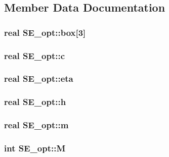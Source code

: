 \subsection{\-Member \-Data \-Documentation}
\hypertarget{structSE__opt_ab90d21148b629a403739afb5c6ccd980}{
\subsubsection[{box}]{\setlength{\rightskip}{0pt plus 5cm}real {\bf \-S\-E\-\_\-opt\-::box}\mbox{[}3\mbox{]}}}\label{structSE__opt_ab90d21148b629a403739afb5c6ccd980}
\hypertarget{structSE__opt_aa8df042d2bbed10a996da67e098d2f00}{
\subsubsection[{c}]{\setlength{\rightskip}{0pt plus 5cm}real {\bf \-S\-E\-\_\-opt\-::c}}}\label{structSE__opt_aa8df042d2bbed10a996da67e098d2f00}
\hypertarget{structSE__opt_a028a96f30b3050e2dfa438a63e6a2a39}{
\subsubsection[{eta}]{\setlength{\rightskip}{0pt plus 5cm}real {\bf \-S\-E\-\_\-opt\-::eta}}}\label{structSE__opt_a028a96f30b3050e2dfa438a63e6a2a39}
\hypertarget{structSE__opt_ae2e1880825b1f20403030c2b8f43a89e}{
\subsubsection[{h}]{\setlength{\rightskip}{0pt plus 5cm}real {\bf \-S\-E\-\_\-opt\-::h}}}\label{structSE__opt_ae2e1880825b1f20403030c2b8f43a89e}
\hypertarget{structSE__opt_af15d0da7ed6b4c7505a917538545fe19}{
\subsubsection[{m}]{\setlength{\rightskip}{0pt plus 5cm}real {\bf \-S\-E\-\_\-opt\-::m}}}\label{structSE__opt_af15d0da7ed6b4c7505a917538545fe19}
\hypertarget{structSE__opt_a0fd608f41f29b58e8f7f597ce9644a07}{
\subsubsection[{\-M}]{\setlength{\rightskip}{0pt plus 5cm}int {\bf \-S\-E\-\_\-opt\-::\-M}}}\label{structSE__opt_a0fd608f41f29b58e8f7f597ce9644a07}
